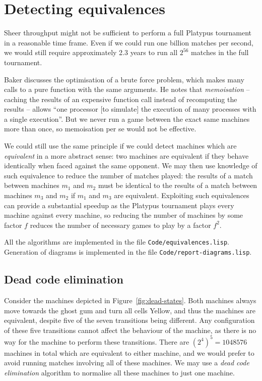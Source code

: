 \chapter{Detecting equivalences}

Sheer throughput might not be sufficient to perform a full Platypus
tournament in a reasonable time frame. Even if we could run one billion
matches per second, we would still require approximately 2.3 years to run
all $2^{56}$ matches in the full tournament.

Baker \cite{triangle} discusses the optimisation of a brute force problem,
which makes many calls to a pure function with the same arguments.
He notes that \emph{memoisation} -- caching the results of an
expensive function call instead of recomputing the results -- allows
``one processor [to simulate] the execution of many processes with a single
execution''. But we never run a game between the exact same machines
more than once, so memoisation per se would not be effective.

We could still use the same principle if we could detect machines
which are \emph{equivalent} in a more abstract sense: two machines
are equivalent if they behave identically when faced against the same
opponent. We may then use knowledge of such equivalence to reduce the
number of matches played: the results of a match between machines $m_1$ and
$m_2$ must be identical to the results of a match between machines $m_3$
and $m_2$ if $m_1$ and $m_3$ are equivalent.
Exploiting such equivalences can provide a substantial speedup as the Platypus
tournament plays every machine against every machine, so reducing the
number of machines by some factor $f$ reduces the number of necessary
games to play by a factor $f^2$.

All the algorithms are implemented in the file \texttt{Code/equivalences.lisp}.
Generation of diagrams is implemented in the file \texttt{Code/report-diagrams.lisp}.

\section{Dead code elimination}

Consider the machines depicted in Figure~\ref{fig:dead-states}.
Both machines always move towards the ghost gum and turn
all cells Yellow, and thus the machines are equivalent, despite
five of the seven transitions being different. Any
configuration of these five transitions cannot affect the behaviour
of the machine, as there is no way for the machine to perform
these transitions. There are $(2^4)^5 = 1048576$ machines in total
which are equivalent to either machine, and we would prefer
to avoid running matches involving all of these machines. We
may use a \emph{dead code elimination} algorithm to normalise
all these machines to just one machine.

